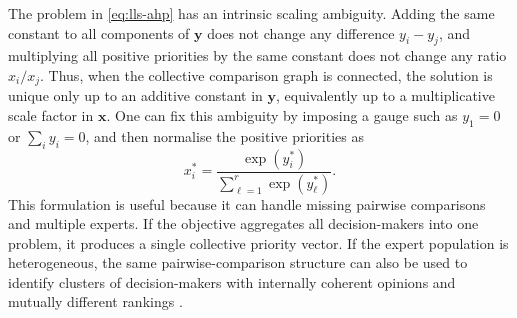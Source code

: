 \documentclass{ieeeaccess}
\begin{document}
The problem in \eqref{eq:lls-ahp} has an intrinsic scaling ambiguity. Adding the same constant to all components of \(\bm{y}\) does not change any difference \(y_i-y_j\), and multiplying all positive priorities by the same constant does not change any ratio \(x_i/x_j\). Thus, when the collective comparison graph is connected, the solution is unique only up to an additive constant in \(\bm{y}\), equivalently up to a multiplicative scale factor in \(\bm{x}\). One can fix this ambiguity by imposing a gauge such as \(y_1=0\) or \(\sum_i y_i=0\), and then normalise the positive priorities as
\begin{equation}
x_i^{*}=\frac{\exp(y_i^{*})}{\sum_{\ell=1}^{r}\exp(y_\ell^{*})}.
\end{equation}
This formulation is useful because it can handle missing pairwise comparisons and multiple experts. If the objective aggregates all decision-makers into one problem, it produces a single collective priority vector. If the expert population is heterogeneous, the same pairwise-comparison structure can also be used to identify clusters of decision-makers with internally coherent opinions and mutually different rankings \cite{oliva_opinion_2019}.
\end{document}
